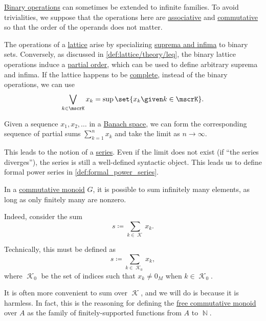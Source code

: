 \begin{remark}\label{rem:binary_operations_to_infinitary}
  \hyperref[def:binary_operation]{Binary operations} can sometimes be extended to infinite families. To avoid trivialities, we suppose that the operations here are \hyperref[def:binary_operation/associative]{associative} and \hyperref[def:binary_operation/commutative]{commutative} so that the order of the operands does not matter.

  \begin{thmenum}
     The operations of a \hyperref[def:lattice]{lattice} arise by specializing \hyperref[def:extremal_points/supremum_and_infimum]{suprema and infima} to binary sets. Conversely, as discussed in \cref{def:lattice/theory/leq}, the binary lattice operations induce a \hyperref[def:partially_ordered_set]{partial order}, which can be used to define arbitrary suprema and infima. If the lattice happens to be \hyperref[def:complete_lattice]{complete}, instead of the binary operations, we can use
    \begin{equation*}
      \bigvee_{k \in \mscrK} x_k = \sup\set{ x_k \given k \in \mscrK }.
    \end{equation*}

     Given a sequence \( x_1, x_2, \ldots \) in a \hyperref[def:banach_space]{Banach space}, we can form the corresponding sequence of partial sums \( \sum_{k=1}^n x_k \) and take the limit as \( n \to \infty \).

    This leads to the notion of a \hyperref[def:convergent_series]{series}. Even if the limit does not exist (if \enquote{the series diverges}), the series is still a well-defined syntactic object. This leads us to define formal power series in \cref{def:formal_power_series}.

     In a \hyperref[def:monoid/commutative]{commutative monoid} \( G \), it is possible to sum infinitely many elements, as long as only finitely many are nonzero.

    Indeed, consider the sum
    \begin{equation*}
      s \coloneqq \sum_{k \in \mscrK} x_k.
    \end{equation*}

    Technically, this must be defined as
    \begin{equation*}
      s \coloneqq \sum_{k \in \mscrK_0} x_k,
    \end{equation*}
    where \( \mscrK_0 \) be the set of indices such that \( x_k \neq 0_M \) when \( k \in \mscrK_0 \).

    It is often more convenient to sum over \( \mscrK \), and we will do is because it is harmless. In fact, this is the reasoning for defining the \hyperref[def:free_commutative_monoid]{free commutative monoid} over \( A \) as the family of finitely-supported functions from \( A \) to \( \BbbN \).
  \end{thmenum}
\end{remark}

